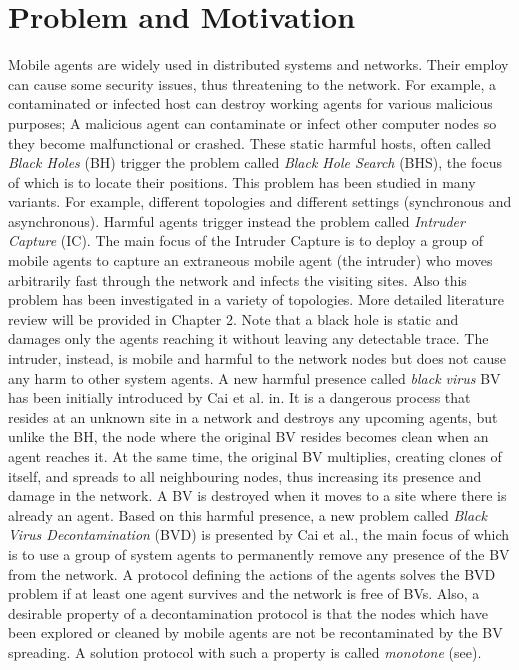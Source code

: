\section{Problem and Motivation} 
Mobile agents are widely used in distributed systems and networks. Their employ can cause some security issues, thus threatening to the network. For example, a contaminated or infected host can destroy working agents for various malicious purposes; A malicious agent can contaminate or infect other computer nodes so they become malfunctional or crashed.
  These static  harmful hosts, often called {\em Black Holes} (BH) trigger the problem called {\em Black Hole Search} (BHS), the focus of which is to locate their positions. This problem has been studied in many variants. For example, different topologies and different settings (synchronous and asynchronous). 
  Harmful agents trigger instead the problem called {\em Intruder Capture} (IC). The main focus of the Intruder Capture  is to deploy a group of mobile agents to capture an extraneous mobile agent (the intruder) who moves arbitrarily fast through the network and infects the visiting sites. Also this problem  has been investigated in a variety of topologies. More detailed literature review will be provided in Chapter 2. Note that a black hole is static and   damages only  the agents reaching it without leaving any detectable trace. The intruder, instead,  is mobile and harmful to the network nodes but does not cause any harm to other system agents. 
    A new harmful presence called {\em black virus} BV has been initially introduced by Cai et al. in\cite{Cai}. It is a dangerous process that resides at an unknown site in a network and destroys any upcoming agents, but unlike the BH, the node where the original BV resides   becomes clean when an agent reaches it. At the same time, the original BV multiplies, creating clones of itself, and spreads to all neighbouring nodes, thus increasing its presence and damage  in the network. A BV is destroyed when it moves to a site where there is already an agent. Based on this harmful presence, a new problem called {\em Black Virus Decontamination} (BVD) is presented by Cai et al., the main focus of which is to use a group of system agents to permanently remove any presence of the BV from the network. A protocol defining the actions of the agents solves the BVD problem if at least one agent survives and the network is free of BVs. Also, a desirable property of a  decontamination protocol is that the nodes which have been explored or cleaned by mobile agents are not be recontaminated by the BV spreading. A solution protocol with such a property is  called {\em monotone} (see\cite{monotone}).
